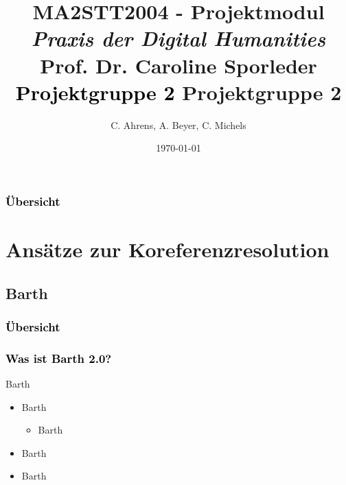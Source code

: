 \documentclass[xcolor=dvipsnames]{beamer}
\title{{\scriptsize{MA2STT2004 - Projektmodul\newline
\\\emph{Praxis der Digital Humanities}
\\Prof. Dr. Caroline Sporleder}}
\newline\\\textcolor{black}{\huge{Projektgruppe 2\newline
}}}
\author{C. Ahrens, A. Beyer, C. Michels}
\institute{Fachbereich II --  Computerlinguistik und Digital Humanities
\newline\\Universität Trier}
\date{\today}
\begin{document}
\begin{frame}[plain]
\titlepage
\end{frame}

\title{Projektgruppe 2}
\institute{}

\begin{frame}[plain]\frametitle{\textcolor{black}{Übersicht}}
\tableofcontents[hideallsubsections]
\end{frame}


\section{Ansätze zur Koreferenzresolution}


\subsection{Barth}


\begin{frame}[plain]\frametitle{\textcolor{black}{Übersicht}}


\end{frame}

\addtocounter{framenumber}{-3}


\begin{frame}\frametitle{\textcolor{black}{Was ist Barth 2.0?}}

\begin{block}{Barth}
\begin{itemize}
\item Barth
\begin{itemize}
\item Barth
\end{itemize}
\item Barth
\item Barth
\end{itemize}
\end{block}

\end{frame}
\end{document}
